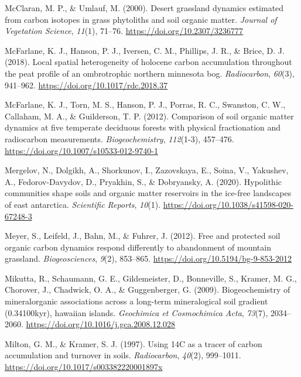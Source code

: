 \documentclass[]{article}
\begin{document}
\leavevmode\hypertarget{ref-McClaran_2000}{}%
McClaran, M. P., \& Umlauf, M. (2000). Desert grassland dynamics
estimated from carbon isotopes in grass phytoliths and soil organic
matter. \emph{Journal of Vegetation Science}, \emph{11}(1), 71--76.
\url{https://doi.org/10.2307/3236777}

\leavevmode\hypertarget{ref-McFarlane_2018}{}%
McFarlane, K. J., Hanson, P. J., Iversen, C. M., Phillips, J. R., \&
Brice, D. J. (2018). Local spatial heterogeneity of holocene carbon
accumulation throughout the peat profile of an ombrotrophic northern
minnesota bog. \emph{Radiocarbon}, \emph{60}(3), 941--962.
\url{https://doi.org/10.1017/rdc.2018.37}

\leavevmode\hypertarget{ref-McFarlane_2012}{}%
McFarlane, K. J., Torn, M. S., Hanson, P. J., Porras, R. C., Swanston,
C. W., Callaham, M. A., \& Guilderson, T. P. (2012). Comparison of soil
organic matter dynamics at five temperate deciduous forests with
physical fractionation and radiocarbon measurements.
\emph{Biogeochemistry}, \emph{112}(1-3), 457--476.
\url{https://doi.org/10.1007/s10533-012-9740-1}

\leavevmode\hypertarget{ref-Mergelov_2020}{}%
Mergelov, N., Dolgikh, A., Shorkunov, I., Zazovskaya, E., Soina, V.,
Yakushev, A., Fedorov-Davydov, D., Pryakhin, S., \& Dobryansky, A.
(2020). Hypolithic communities shape soils and organic matter reservoirs
in the ice-free landscapes of east antarctica. \emph{Scientific
Reports}, \emph{10}(1). \url{https://doi.org/10.1038/s41598-020-67248-3}

\leavevmode\hypertarget{ref-Meyer_2012}{}%
Meyer, S., Leifeld, J., Bahn, M., \& Fuhrer, J. (2012). Free and
protected soil organic carbon dynamics respond differently to
abandonment of mountain grassland. \emph{Biogeosciences}, \emph{9}(2),
853--865. \url{https://doi.org/10.5194/bg-9-853-2012}

\leavevmode\hypertarget{ref-Mikutta_2009}{}%
Mikutta, R., Schaumann, G. E., Gildemeister, D., Bonneville, S., Kramer,
M. G., Chorover, J., Chadwick, O. A., \& Guggenberger, G. (2009).
Biogeochemistry of mineralorganic associations across a long-term
mineralogical soil gradient (0.34100kyr), hawaiian islands.
\emph{Geochimica et Cosmochimica Acta}, \emph{73}(7), 2034--2060.
\url{https://doi.org/10.1016/j.gca.2008.12.028}

\leavevmode\hypertarget{ref-Milton_1997}{}%
Milton, G. M., \& Kramer, S. J. (1997). Using 14C as a tracer of carbon
accumulation and turnover in soils. \emph{Radiocarbon}, \emph{40}(2),
999--1011. \url{https://doi.org/10.1017/s003382220001897x}
\end{document}
